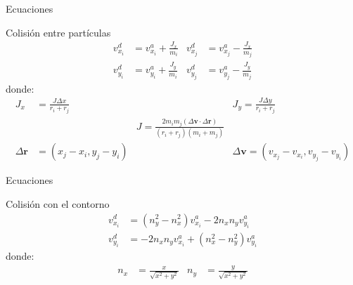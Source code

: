 \begin{frame}{Ecuaciones}
    \begin{block}{Colisión entre partículas}
        \begin{equation*}
            \begin{aligned}
                v_{x_i}^{d} &= v_{x_i}^{a} + \frac{J_x}{m_i} &
                v_{x_j}^{d} &= v_{x_j}^{a} - \frac{J_x}{m_j} \\
                v_{y_i}^{d} &= v_{y_i}^{a} + \frac{J_y}{m_i} &
                v_{y_j}^{d} &= v_{y_j}^{a} - \frac{J_y}{m_j}
            \end{aligned}\label{eq:equation-particles-collision}
        \end{equation*}
        donde:
        \begin{equation*}
            \begin{aligned}
                J_x &= \frac{J\Delta{x}}{r_i+r_j} &&
                J_y = \frac{J\Delta{y}}{r_i+r_j} \\&&
                J = \frac{2 m_i m_j (\Delta{\mathbf{v}} \cdot \Delta{\mathbf{r}})}{(r_i+r_j)(m_i+m_j)} \\
                \Delta{\mathbf{r}} &= (x_j - x_i, y_j - y_i) &&
                \Delta{\mathbf{v}} = (v_{x_j} - v_{x_i}, v_{y_j} - v_{y_i})
            \end{aligned}\label{eq:equation-particles-collision-variables}
        \end{equation*}
    \end{block}

\end{frame}

\begin{frame}{Ecuaciones}

    \begin{block}{Colisión con el contorno}
        \begin{equation*}
            \begin{aligned}
                v_{x_i}^{d} &= (n_y^2 - n_x^2) v_{x_i}^{a} - 2 n_x n_y v_{y_i}^{a} \\
                v_{y_i}^{d} &= -2 n_x n_y v_{x_i}^{a} + (n_x^2 - n_y^2) v_{y_i}^{a}
            \end{aligned}\label{eq:equation-particles-collision-wall}
        \end{equation*}
        donde:
        \begin{equation*}
            \begin{aligned}
                n_x &= \frac{x}{\sqrt{x^2 + y^2}} &
                n_y &= \frac{y}{\sqrt{x^2 + y^2}}
            \end{aligned}\label{eq:equation-particles-collision-wall-variables}
        \end{equation*}
    \end{block}
\end{frame}

